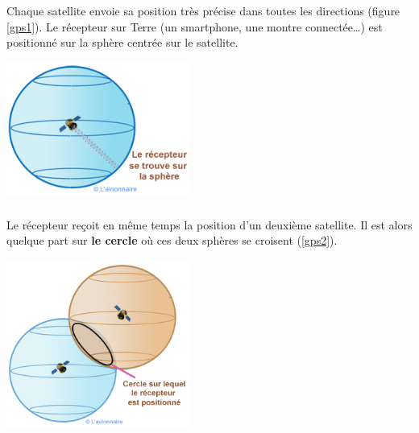 \documentclass[svgnames,11pt]{beamer}
\begin{document}
\begin{frame}
    \frametitle{}

    Chaque satellite envoie sa position très précise dans toutes les directions (figure \ref{gps1}). Le récepteur sur Terre (un smartphone, une montre connectée\dots) est positionné sur la sphère centrée sur le satellite.
    \begin{center}
        \centering
        \includegraphics[width=6cm]{ressources/gps1.png}

        \label{gps1}
    \end{center}

\end{frame}
\begin{frame}
    \frametitle{}

    Le récepteur reçoit en même temps la position d'un deuxième satellite. Il est alors quelque part sur \textbf{le cercle} où ces deux sphères se croisent (\ref{gps2}).
    \begin{center}
        \centering
        \includegraphics[width=6cm]{ressources/gps2.png}

        \label{gps2}
    \end{center}

\end{frame}
\end{document}
